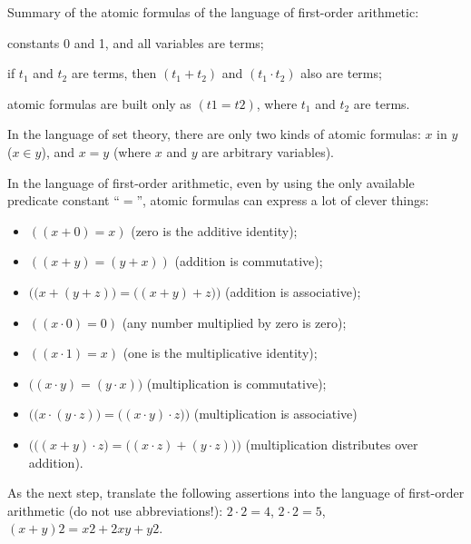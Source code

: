 \begin{example}
Summary of the atomic formulas of the language of first-order arithmetic:

\begin{inparaenum}[(a)]
    \item constants 0 and 1, and all variables are terms;
    \item if \(t_1\) and \(t_2\) are terms, then \((t_1+t_2)\) and \((t_1\cdot t_2)\) also are terms;
    \item atomic formulas are built only as \((t1=t2)\), where \(t_1\) and \(t_2\) are terms.
\end{inparaenum}
\end{example}

\begin{example}
In the language of set theory, there are only two kinds of atomic formulas: \(x\) in \(y\) (\(x\in y\)), and \(x=y\) (where \(x\) and \(y\) are arbitrary variables).
\end{example}
In the language of first-order arithmetic, even by using the only available predicate constant ``\(=\)'', atomic formulas can express a lot of clever things:

\begin{itemize}
    \item \(((x+0)=x)\) (zero is the additive identity);
    \item \(((x+y)=(y+x))\) (addition is commutative);
    \item \(\Big(\big(x+(y+z)\big)=\big((x+y)+z\big)\Big)\) (addition is associative);
    \item \(((x\cdot 0)=0)\) (any number multiplied by zero is zero);
    \item \(((x\cdot 1)=x)\) (one is the multiplicative identity);
    \item \(\big((x\cdot y)=(y\cdot x)\big)\) (multiplication is commutative);
    \item \(\Big(\big(x\cdot (y\cdot z)\big)=\big((x\cdot y)\cdot z\big)\Big)\) (multiplication is associative)
    \item \(\Big(\big((x+y)\cdot z\big)=\big((x\cdot z)+(y\cdot z)\big)\Big)\) (multiplication distributes over addition).
\end{itemize}

\begin{exercise}
As the next step, translate the following assertions into the language of first-order arithmetic (do not use abbreviations!): \(2\cdot 2=4\), \(2\cdot 2=5\), \((x+y)2 = x2+2xy+y2\).
\end{exercise}

